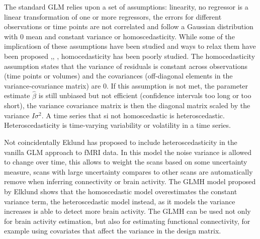 \documentclass[10pt,letterpaper]{article}
\begin{document}
The standard GLM relies upon a set of assumptions: linearity, no regressor is a linear transformation of one or more regressors, the errors for different observations or time points are not correlated and follow a Gaussian distribution with 0 mean and constant variance or homoscedasticity. While some of the implicatiosn of these assumptions have been studied and ways to relax them have been proposed \cite{lund2006non},\citep{murphy2007long}, \citep{eklund2012does}, homocedasticity has been poorly studied. 
The homocedasticity assumption states that the variance of residuals is constant across observations (time points or volumes) and the covariances (off-diagonal elements in the variance-covariance matrix) are 0. If this assumption is not met, the parameter estimate $\hat{\beta}$ is still unbiased but not efficient (confidence intervals too long or too short), the variance covariance matrix is then the diagonal matrix scaled by the variance $I\sigma^2$.
A time series that si not homoscedastic is heteroscedastic. Heteroscedasticity is time-varying variability or volatility in a time series.

Not coincidentally Eklund \citep{eklund2017bayesian} has proposed to include heteroscedasticity in the vanilla GLM approach to fMRI data. %
In this model the noise variance is allowed to change over time, this allows to weight the scans based on some uncertainty measure, scans with large uncertainty compares to other scans are automatically  remove when inferring connectivity or brain activity.
The GLMH model proposed by Elklund shows that the homoscedastic model overestimates the constant variance term, the heteroscedastic model instead, as it models the variance increases is able to detect more brain activity. The GLMH can be used not only for brain activity estimation, but also for estimating functional connectivity, for example using covariates that affect the variance in the design matrix. 
\end{document}
